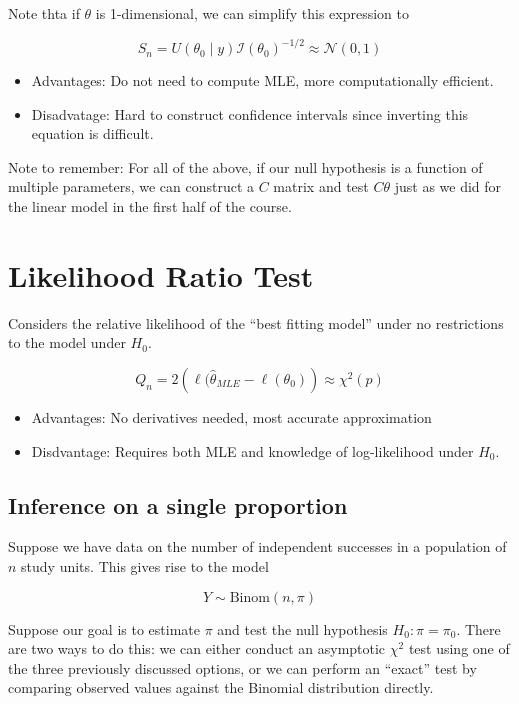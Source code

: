 \documentclass[
  letterpaper,
  DIV=11,
  numbers=noendperiod]{scrreport}
\providecommand{\tightlist}{%
  \setlength{\itemsep}{0pt}\setlength{\parskip}{0pt}}\usepackage{longtable,booktabs,array}
\begin{document}
Note thta if \(\theta\) is 1-dimensional, we can simplify this
expression to

\[S_n = U(\theta_0 \mid y) \mathcal I(\theta_0)^{-1/2} \approx \mathcal N(0, 1)\]

\begin{itemize}
\tightlist
\item
  Advantages: Do not need to compute MLE, more computationally
  efficient.
\item
  Disadvatage: Hard to construct confidence intervals since inverting
  this equation is difficult.
\end{itemize}

Note to remember: For all of the above, if our null hypothesis is a
function of multiple parameters, we can construct a \(C\) matrix and
test \(C \theta\) just as we did for the linear model in the first half
of the course.

\hypertarget{likelihood-ratio-test}{%
\section{Likelihood Ratio Test}\label{likelihood-ratio-test}}

Considers the relative likelihood of the ``best fitting model'' under no
restrictions to the model under \(H_0\).

\[Q_n = 2 \left( \ell(\hat\theta_{MLE} - \ell(\theta_0) \right) \approx \chi^2(p)\]

\begin{itemize}
\tightlist
\item
  Advantages: No derivatives needed, most accurate approximation
\item
  Disdvantage: Requires both MLE and knowledge of log-likelihood under
  \(H_0\).
\end{itemize}

\hypertarget{inference-on-a-single-proportion}{%
\subsection{Inference on a single
proportion}\label{inference-on-a-single-proportion}}

Suppose we have data on the number of independent successes in a
population of \(n\) study units. This gives rise to the model

\[Y \sim \text{Binom}(n, \pi)\]

Suppose our goal is to estimate \(\pi\) and test the null hypothesis
\(H_0 : \pi = \pi_0\). There are two ways to do this: we can either
conduct an asymptotic \(\chi^2\) test using one of the three previously
discussed options, or we can perform an ``exact'' test by comparing
observed values against the Binomial distribution directly.
\end{document}

